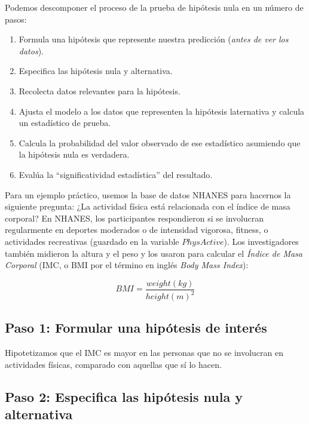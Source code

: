 \documentclass[
  12pt,
]{book}
\providecommand{\tightlist}{%
  \setlength{\itemsep}{0pt}\setlength{\parskip}{0pt}}
\begin{document}
Podemos descomponer el proceso de la prueba de hipótesis nula en un número de pasos:

\begin{enumerate}
\def\labelenumi{\arabic{enumi}.}
\tightlist
\item
  Formula una hipótesis que represente nuestra predicción (\emph{antes de ver los datos}).
\item
  Especifica las hipótesis nula y alternativa.
\item
  Recolecta datos relevantes para la hipótesis.
\item
  Ajusta el modelo a los datos que representen la hipótesis laternativa y calcula un estadístico de prueba.
\item
  Calcula la probabilidad del valor observado de ese estadístico asumiendo que la hipótesis nula es verdadera.
\item
  Evalúa la ``significatividad estadística'' del resultado.
\end{enumerate}

Para un ejemplo práctico, usemos la base de datos NHANES para hacernos la siguiente pregunta: ¿La actividad física está relacionada con el índice de masa corporal? En NHANES, los participantes respondieron si se involucran regularmente en deportes moderados o de intensidad vigorosa, fitness, o actividades recreativas (guardado en la variable \(PhysActive\)). Los investigadores también midieron la altura y el peso y los usaron para calcular el \emph{Índice de Masa Corporal} (IMC, o BMI por el término en inglés \emph{Body Mass Index}):

\[
BMI = \frac{weight(kg)}{height(m)^2}
\]

\hypertarget{paso-1-formular-una-hipuxf3tesis-de-interuxe9s}{%
\subsection{Paso 1: Formular una hipótesis de interés}\label{paso-1-formular-una-hipuxf3tesis-de-interuxe9s}}

Hipotetizamos que el IMC es mayor en las personas que no se involucran en actividades físicas, comparado con aquellas que sí lo hacen.

\hypertarget{paso-2-especifica-las-hipuxf3tesis-nula-y-alternativa}{%
\subsection{Paso 2: Especifica las hipótesis nula y alternativa}\label{paso-2-especifica-las-hipuxf3tesis-nula-y-alternativa}}
\end{document}

